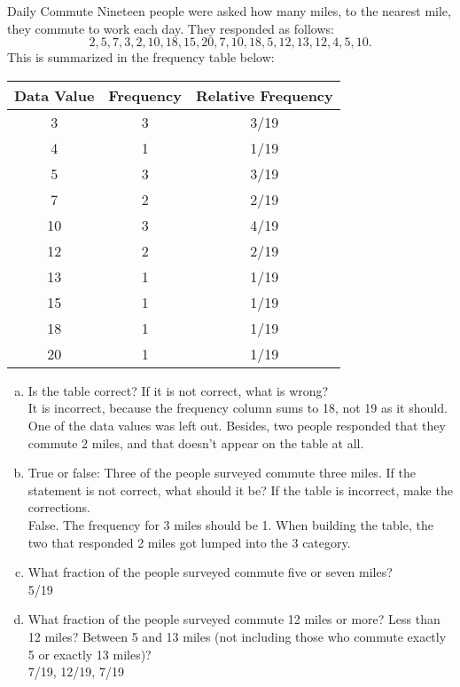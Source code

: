 \begin{example}[https://www.youtube.com/watch?v=VQhKtct3nog]{Daily Commute}
Nineteen people were asked how many miles, to the nearest mile, they commute to work each day. They responded as follows: \[2, 5, 7, 3, 2, 10, 18, 15, 20, 7, 10, 18, 5, 12, 13, 12, 4, 5, 10.\] This is summarized in the frequency table below:

\begin{center}
\begin{tabular}{c | c | c}
\textbf{Data Value} & \textbf{Frequency} & \textbf{Relative Frequency}\\
\hline
3 & 3 & 3/19 \\
4 & 1 & 1/19 \\
5 & 3 & 3/19 \\
7 & 2 & 2/19 \\
10 & 3 & 4/19 \\
12 & 2 & 2/19 \\
13 & 1 & 1/19 \\
15 & 1 & 1/19 \\
18 & 1 & 1/19 \\
20 & 1 & 1/19  
\end{tabular}
\end{center}

\begin{enumerate}[(a)]
\item Is the table correct? If it is not correct, what is wrong?\\

It is incorrect, because the frequency column sums to 18, not 19 as it should.  One of the data values was left out.  Besides, two people responded that they commute 2 miles, and that doesn't appear on the table at all.\\

\item True or false: Three of the people surveyed commute three miles. If the statement is not correct, what should it be? If the table is incorrect, make the corrections.\\

False.  The frequency for 3 miles should be 1.  When building the table, the two that responded 2 miles got lumped into the 3 category.\\

\item What fraction of the people surveyed commute five or seven miles?\\

5/19\\

\item What fraction of the people surveyed commute 12 miles or more? Less than 12 miles? Between 5 and 13 miles (not including those who commute exactly 5 or exactly 13 miles)?\\

7/19, 12/19, 7/19
\end{enumerate}
\end{example}
\pagebreak
\text{}
\vfill

